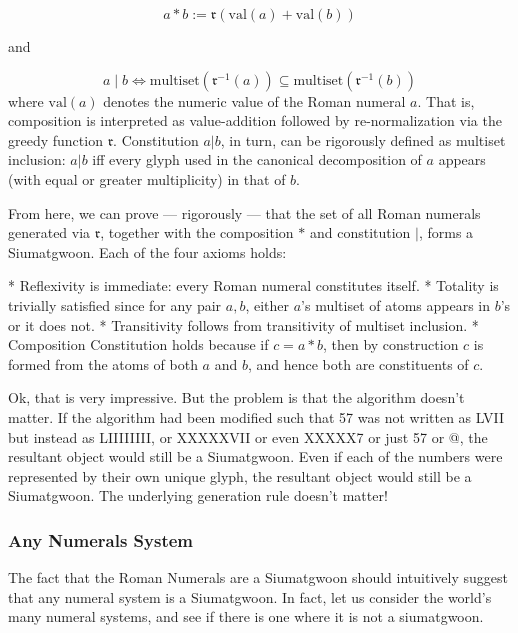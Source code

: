 $$
a * b := \mathfrak{r}(\mathrm{val}(a) + \mathrm{val}(b))
$$

and 

$$a \mid b \iff \text{multiset}(\mathfrak{r}^{-1}(a)) \subseteq \text{multiset}(\mathfrak{r}^{-1}(b))$$
where $\mathrm{val}(a)$ denotes the numeric value of the Roman numeral $a$. That is, composition is interpreted as value-addition followed by re-normalization via the greedy function $\mathfrak{r}$. Constitution $a | b$, in turn, can be rigorously defined as multiset inclusion: $a | b$ iff every glyph used in the canonical decomposition of $a$ appears (with equal or greater multiplicity) in that of $b$.

From here, we can prove — rigorously — that the set of all Roman numerals generated via $\mathfrak{r}$, together with the composition $*$ and constitution $|$, forms a Siumatgwoon. Each of the four axioms holds:

* Reflexivity is immediate: every Roman numeral constitutes itself.
* Totality is trivially satisfied since for any pair $a, b$, either $a$’s multiset of atoms appears in $b$’s or it does not.
* Transitivity follows from transitivity of multiset inclusion.
* Composition Constitution holds because if $c = a * b$, then by construction $c$ is formed from the atoms of both $a$ and $b$, and hence both are constituents of $c$.




Ok, that is very impressive. But the problem is that the algorithm doesn't matter. If the algorithm had been modified such that 57 was not written as LVII but instead as LIIIIIIII, or XXXXXVII or even XXXXX7 or just 57 or @, the resultant object would still be a Siumatgwoon. Even if each of the numbers were represented by their own unique glyph, the resultant object would still be a Siumatgwoon. The underlying generation rule doesn't matter!




\subsubsection{Any Numerals System}

The fact that the Roman Numerals are a Siumatgwoon should intuitively suggest that any numeral system is a Siumatgwoon. In fact, let us consider the world's many numeral systems, and see if there is one where it is not a siumatgwoon. 


